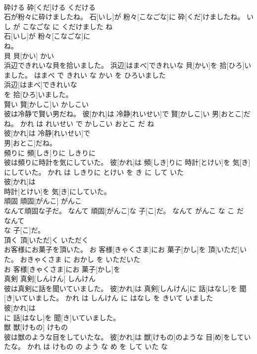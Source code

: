 \documentclass[8pt]{extreport}
\begin{document}
\begin{CJK}{UTF8}{min}
\\	砕ける	砕[くだ]ける	くだける	
\\	石が粉々に砕けましたね。	石[いし]が 粉々[こなごな]に 砕[くだ]けましたね。	いし が こなごな に くだけました ね	
\\	石[いし]が 粉々[こなごな]に
\\	ね。			
\\	貝	貝[かい]	かい	
\\	浜辺できれいな貝を拾いました。	浜辺[はまべ]できれいな 貝[かい]を 拾[ひろ]いました。	はまべ で きれい な かい を ひろいました	
\\	浜辺[はまべ]できれいな
\\	を 拾[ひろ]いました。			
\\	賢い	賢[かしこ]い	かしこい	
\\	彼は冷静で賢い男だね。	彼[かれ]は 冷静[れいせい]で 賢[かしこ]い 男[おとこ]だね。	かれ は れいせい で かしこい おとこ だ ね	
\\	彼[かれ]は 冷静[れいせい]で
\\	男[おとこ]だね。			
\\	頻りに	頻[しき]りに	しきりに	
\\	彼は頻りに時計を気にしていた。	彼[かれ]は 頻[しき]りに 時計[とけい]を 気[き]にしていた。	かれ は しきりに とけい を き に して いた	
\\	彼[かれ]は
\\	時計[とけい]を 気[き]にしていた。			
\\	頑固	頑固[がんこ]	がんこ	
\\	なんて頑固な子だ。	なんて 頑固[がんこ]な 子[こ]だ。	なんて がんこ な こ だ	
\\	なんて
\\	な 子[こ]だ。			
\\	頂く	頂[いただ]く	いただく	
\\	お客様にお菓子を頂いた。	お 客様[きゃくさま]にお 菓子[かし]を 頂[いただ]いた。	おきゃくさま に おかし を いただいた	
\\	お 客様[きゃくさま]にお 菓子[かし]を
\\	真剣	真剣[しんけん]	しんけん	
\\	彼は真剣に話を聞いていました。	彼[かれ]は 真剣[しんけん]に 話[はなし]を 聞[き]いていました。	かれ は しんけん に はなし を きいて いました	
\\	彼[かれ]は
\\	に 話[はなし]を 聞[き]いていました。			
\\	獣	獣[けもの]	けもの	
\\	彼は獣のような目をしていたな。	彼[かれ]は 獣[けもの]のような 目[め]をしていたな。	かれ は けもの の よう な め を して いた な	

\end{CJK}
\end{document}
